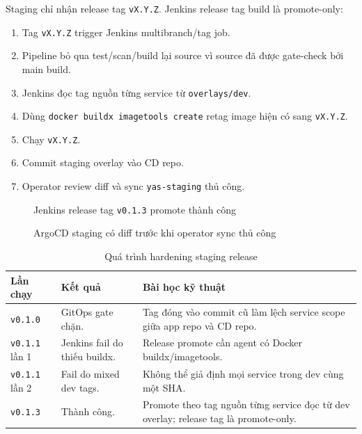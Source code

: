 Staging chỉ nhận release tag \texttt{vX.Y.Z}. Jenkins release tag build là
promote-only:

\begin{enumerate}
    \item Tag \texttt{vX.Y.Z} trigger Jenkins multibranch/tag job.
    \item Pipeline bỏ qua test/scan/build lại source vì source đã được gate-check bởi main build.
    \item Jenkins đọc tag nguồn từng service từ \texttt{overlays/dev}.
    \item Dùng \texttt{docker buildx imagetools create} retag image hiện có sang \texttt{vX.Y.Z}.
    \item Chạy  \texttt{vX.Y.Z}.
    \item Commit staging overlay vào CD repo.
    \item Operator review diff và sync \texttt{yas-staging} thủ công.
\end{enumerate}



\begin{figure}[H]
\centering
{}
\caption{Jenkins release tag \texttt{v0.1.3} promote thành công}
\end{figure}

\begin{figure}[H]
\centering
{}
\caption{ArgoCD staging có diff trước khi operator sync thủ công}
\end{figure}

\begin{table}[H]
\centering
\caption{Quá trình hardening staging release}
\begin{tabular}{|p{2.4cm}|p{4.5cm}|p{6.4cm}|}
\hline
\textbf{Lần chạy} & \textbf{Kết quả} & \textbf{Bài học kỹ thuật} \\
\hline
\texttt{v0.1.0} & GitOps gate chặn. & Tag đóng vào commit cũ làm lệch service scope giữa app repo và CD repo. \\
\hline
\texttt{v0.1.1} lần 1 & Jenkins fail do thiếu buildx. & Release promote cần agent có Docker buildx/imagetools. \\
\hline
\texttt{v0.1.1} lần 2 & Fail do mixed dev tags. & Không thể giả định mọi service trong dev cùng một SHA. \\
\hline
\texttt{v0.1.3} & Thành công. & Promote theo tag nguồn từng service đọc từ dev overlay; release tag là promote-only. \\
\hline
\end{tabular}
\end{table}

